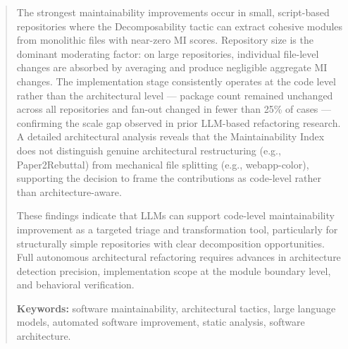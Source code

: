 \begin{abstract}
The strongest maintainability improvements occur in small, script-based repositories where the Decomposability tactic can extract cohesive modules from monolithic files with near-zero MI scores. Repository size is the dominant moderating factor: on large repositories, individual file-level changes are absorbed by averaging and produce negligible aggregate MI changes. The implementation stage consistently operates at the code level rather than the architectural level — package count remained unchanged across all repositories and fan-out changed in fewer than 25\% of cases — confirming the scale gap observed in prior LLM-based refactoring research. A detailed architectural analysis reveals that the Maintainability Index does not distinguish genuine architectural restructuring (e.g., Paper2Rebuttal) from mechanical file splitting (e.g., webapp-color), supporting the decision to frame the contributions as code-level rather than architecture-aware.

These findings indicate that LLMs can support code-level maintainability improvement as a targeted triage and transformation tool, particularly for structurally simple repositories with clear decomposition opportunities. Full autonomous architectural refactoring requires advances in architecture detection precision, implementation scope at the module boundary level, and behavioral verification.

\vspace{1em}
\noindent
\textbf{Keywords:} software maintainability, architectural tactics, large language models, automated software improvement, static analysis, software architecture.
\end{abstract}
